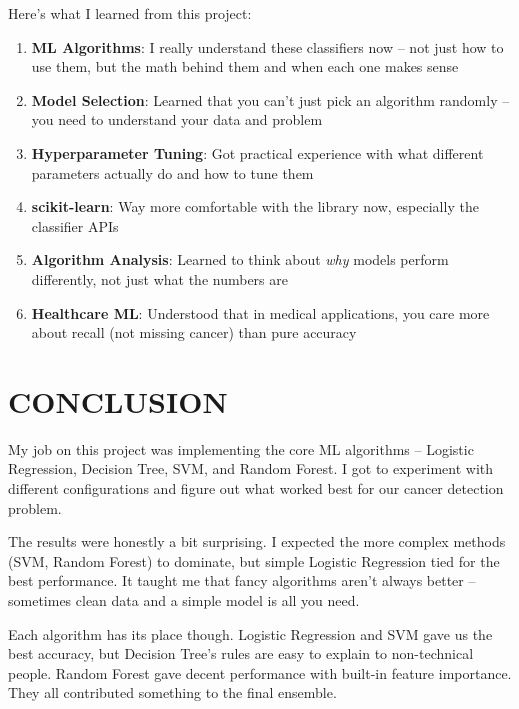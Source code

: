 \documentclass[12pt]{article}
\begin{document}
Here's what I learned from this project:

\begin{enumerate}
    \item \textbf{ML Algorithms}: I really understand these classifiers now -- not just how to use them, but the math behind them and when each one makes sense
    
    \item \textbf{Model Selection}: Learned that you can't just pick an algorithm randomly -- you need to understand your data and problem
    
    \item \textbf{Hyperparameter Tuning}: Got practical experience with what different parameters actually do and how to tune them
    
    \item \textbf{scikit-learn}: Way more comfortable with the library now, especially the classifier APIs
    
    \item \textbf{Algorithm Analysis}: Learned to think about \textit{why} models perform differently, not just what the numbers are
    
    \item \textbf{Healthcare ML}: Understood that in medical applications, you care more about recall (not missing cancer) than pure accuracy
\end{enumerate}

\newpage
\section{CONCLUSION}

My job on this project was implementing the core ML algorithms -- Logistic Regression, Decision Tree, SVM, and Random Forest. I got to experiment with different configurations and figure out what worked best for our cancer detection problem.

The results were honestly a bit surprising. I expected the more complex methods (SVM, Random Forest) to dominate, but simple Logistic Regression tied for the best performance. It taught me that fancy algorithms aren't always better -- sometimes clean data and a simple model is all you need.

Each algorithm has its place though. Logistic Regression and SVM gave us the best accuracy, but Decision Tree's rules are easy to explain to non-technical people. Random Forest gave decent performance with built-in feature importance. They all contributed something to the final ensemble.
\end{document}
